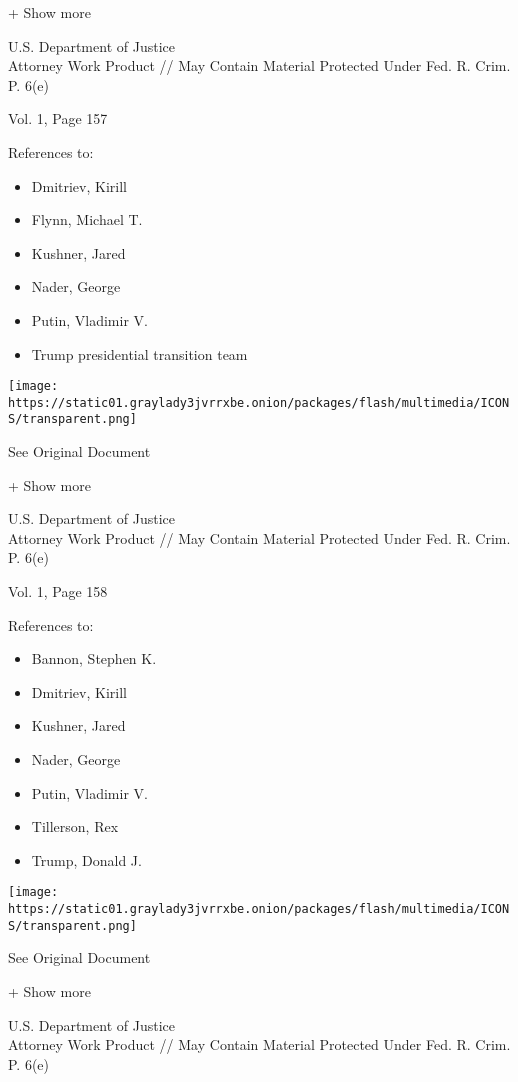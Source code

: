 + Show more

U.S. Department of Justice\\
Attorney Work Product // May Contain Material Protected Under Fed. R.
Crim. P. 6(e)

Vol. 1, Page 157

References to:

\begin{itemize}
\tightlist
\item
  Dmitriev, Kirill
\item
  Flynn, Michael T.
\item
  Kushner, Jared
\item
  Nader, George
\item
  Putin, Vladimir V.
\item
  Trump presidential transition team
\end{itemize}

\protect\hyperlink{}{}

\texttt{[image: https://static01.graylady3jvrrxbe.onion/packages/flash/multimedia/ICONS/transparent.png]}

See Original Document

+ Show more

U.S. Department of Justice\\
Attorney Work Product // May Contain Material Protected Under Fed. R.
Crim. P. 6(e)

Vol. 1, Page 158

References to:

\begin{itemize}
\tightlist
\item
  Bannon, Stephen K.
\item
  Dmitriev, Kirill
\item
  Kushner, Jared
\item
  Nader, George
\item
  Putin, Vladimir V.
\item
  Tillerson, Rex
\item
  Trump, Donald J.
\end{itemize}

\protect\hyperlink{}{}

\texttt{[image: https://static01.graylady3jvrrxbe.onion/packages/flash/multimedia/ICONS/transparent.png]}

See Original Document

+ Show more

U.S. Department of Justice\\
Attorney Work Product // May Contain Material Protected Under Fed. R.
Crim. P. 6(e)

